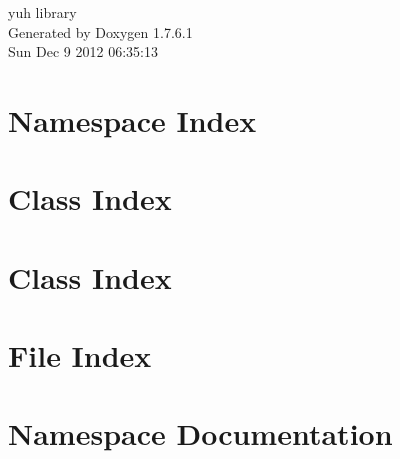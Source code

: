 \documentclass[a4paper]{book}
\begin{document}
\hypersetup{pageanchor=false,citecolor=blue}
\begin{titlepage}
\vspace*{7cm}
\begin{center}
{\Large yuh library }\\
\vspace*{1cm}
{\large \-Generated by Doxygen 1.7.6.1}\\
\vspace*{0.5cm}
{\small Sun Dec 9 2012 06:35:13}\\
\end{center}
\end{titlepage}
\clearemptydoublepage
{}
\tableofcontents
\clearemptydoublepage
{}
\hypersetup{pageanchor=true,citecolor=blue}
\chapter{\-Namespace \-Index}

\chapter{\-Class \-Index}

\chapter{\-Class \-Index}

\chapter{\-File \-Index}

\chapter{\-Namespace \-Documentation}







\end{document}
